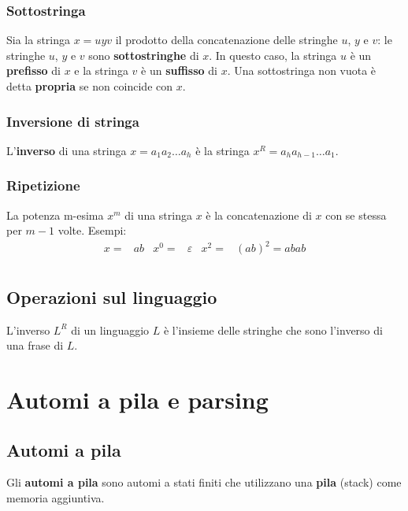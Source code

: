 \documentclass[11pt]{article}
\begin{document}
\subsubsection{Sottostringa}
Sia la stringa $x=uyv$ il prodotto della concatenazione delle stringhe $u$, $y$ e $v$: le stringhe $u$, $y$ e $v$ sono 
\textbf{sottostringhe} di $x$. In questo caso, la stringa $u$ è un \textbf{prefisso} di $x$ e la stringa $v$ è un 
\textbf{suffisso} di $x$. Una sottostringa non vuota è detta \textbf{propria} se non coincide con $x$.
\subsubsection{Inversione di stringa}
L'\textbf{inverso} di una stringa $x=a_1a_2\dots a_h$ è la stringa $x^R=a_ha_{h-1}\dots a_1$.
\subsubsection{Ripetizione}
La potenza m-esima $x^m$ di una stringa $x$ è la concatenazione di $x$ con se stessa per $m-1$ volte. Esempi:
\begin{align*}
    x=&ab    &   x^0=&\varepsilon    &   x^2=&(ab)^2=abab\\  
\end{align*}
\subsection{Operazioni sul linguaggio}
L'inverso $L^R$ di un linguaggio $L$ è l'insieme delle stringhe che sono l'inverso di una frase di $L$.

\section{Automi a pila e parsing}
\subsection{Automi a pila}
Gli \textbf{automi a pila} sono automi a stati finiti che utilizzano una \textbf{pila} (stack) come memoria aggiuntiva.
\end{document}

